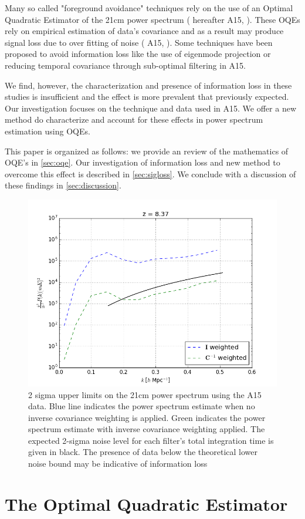 \documentclass[preprint2,hidelinks]{emulateapj}
\begin{document}
{ Many so called "foreground avoidance" techniques rely on the use of 
 an Optimal Quadratic Estimator of the 21cm power spectrum (\citealt{ali_et_al2015} hereafter A15, 
 \citealt{liu_tegmark2011,dillon_et_al2013a,
 dillon_et_al2015,liu_et_al2014a,
 liu_et_al2014b,trott_et_al2012}). These OQEs rely on empirical estimation of data's covariance and as a result may produce signal loss due to over fitting of noise ( A15, \citet{dillon_et_al2015,switzer_liu2014}). Some techniques have been proposed to avoid information loss like the use of eigenmode projection \citep{dillon_et_al2015} or reducing temporal covariance through sub-optimal filtering in A15. 
 
 We find, however, the characterization and presence of information loss in these studies is insufficient and the effect is more prevalent that previously expected. Our investigation focuses on the technique and data used in A15. We offer a new method do characterize and account for these effects in power spectrum estimation using OQEs.


This paper is organized as follows: we provide an review of the mathematics of OQE's in \autoref{sec:oqe}. Our investigation of information loss and new method to overcome this effect is described in \autoref{sec:sigloss}. We conclude with a discussion of these findings in \autoref{sec:discussion}.
}


\begin{figure}[t]
\centering
\includegraphics[width=.45\textwidth]{ali_upperlims.png}
\caption{2 sigma upper limits on the 21cm power spectrum using the A15 data. Blue line indicates the power spectrum estimate when no inverse covariance weighting is applied. Green indicates the power spectrum estimate with inverse covariance weighting applied. The expected 2-sigma noise level for each filter's total integration time is given in black. The presence of data below the theoretical lower noise bound may be indicative of information loss \label{fig:ali_pi_vs_pc}}
\end{figure}

\section{The Optimal Quadratic Estimator}\label{sec:oqe}{

}
\end{document}
